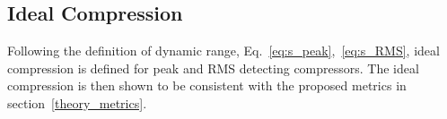\documentclass[../main2.tex]{subfiles}
\providecommand{\rootdir}{..}
\begin{document}
\FloatBarrier
\subsection{Ideal Compression}
Following the definition of dynamic range, Eq.~\eqref{eq:s_peak},~\eqref{eq:s_RMS}, ideal compression is defined for peak and RMS detecting compressors. The ideal compression is then shown to be consistent with the proposed metrics in section~\ref{theory_metrics}.



\end{document}
